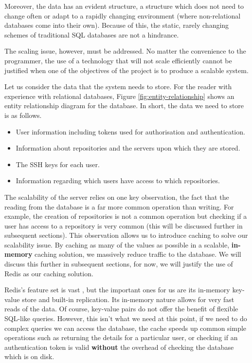 Moreover, the data has an evident structure, a structure which does not need to change often or adapt to a rapidly changing environment (where non-relational databases come into their own). Because of this, the static, rarely changing schemes of traditional SQL databases are not a hindrance. 

The scaling issue, however, must be addressed. No matter the convenience to the programmer, the use of a technology that will not scale efficiently cannot be justified when one of the objectives of the project is to produce a scalable system. 

Let us consider the data that the system needs to store. For the reader with experience with relational databases, Figure \ref{fig:entity-relationship} shows an entity relationship diagram for the database. In short, the data we need to store is as follows.

\begin{itemize}
\item User information including tokens used for authorisation and authentication.
\item Information about repositories and the servers upon which they are stored.
\item The SSH keys for each user.
\item Information regarding which users have access to which repositories.
\end{itemize}


The scalability of the server relies on one key observation, the fact that the reading from the database is a far more common operation than writing. For example, the creation of repositories is not a common operation but checking if a user has access to a repository is very common (this will be discussed further in subsequent sections). This observation allows us to introduce caching to solve our scalability issue. By caching as many of the values as possible in a scalable, \textbf{in-memory} caching solution, we massively reduce traffic to the database. We will discuss this further in subsequent sections, for now, we will justify the use of Redis \cite{redis} as our caching solution.

Redis's feature set is vast \cite{redis}, but the important ones for us are its in-memory key-value store and built-in replication. Its in-memory nature allows for very fast reads of the data. Of course, key-value pairs do not offer the benefit of flexible SQL-like queries. However, this isn't what we need at this point, if we need to do complex queries we can access the database, the cache speeds up common simple operations such as returning the details for a particular user, or checking if an authentication token is valid \textbf{without} the overhead of checking the database which is on disk.

